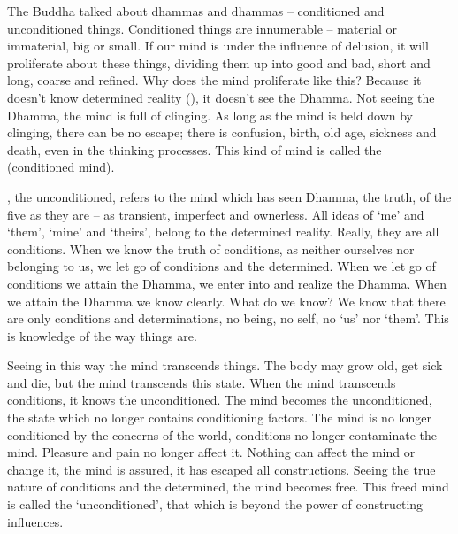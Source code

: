 The Buddha talked about  dhammas and  dhammas -- conditioned and unconditioned things. Conditioned things are innumerable -- material or immaterial, big or small. If our mind is under the influence of delusion, it will proliferate about these things, dividing them up into good and bad, short and long, coarse and refined. Why does the mind proliferate like this? Because it doesn't know determined reality (), it doesn't see the Dhamma. Not seeing the Dhamma, the mind is full of clinging. As long as the mind is held down by clinging, there can be no escape; there is confusion, birth, old age, sickness and death, even in the thinking processes. This kind of mind is called the  (conditioned mind).

, the unconditioned, refers to the mind which has seen Dhamma, the truth, of the five  as they are -- as transient, imperfect and ownerless. All ideas of `me' and `them', `mine' and `theirs', belong to the determined reality. Really, they are all conditions. When we know the truth of conditions, as neither ourselves nor belonging to us, we let go of conditions and the determined. When we let go of conditions we attain the Dhamma, we enter into and realize the Dhamma. When we attain the Dhamma we know clearly. What do we know? We know that there are only conditions and determinations, no being, no self, no `us' nor `them'. This is knowledge of the way things are.

Seeing in this way the mind transcends things. The body may grow old, get sick and die, but the mind transcends this state. When the mind transcends conditions, it knows the unconditioned. The mind becomes the unconditioned, the state which no longer contains conditioning factors. The mind is no longer conditioned by the concerns of the world, conditions no longer contaminate the mind. Pleasure and pain no longer affect it. Nothing can affect the mind or change it, the mind is assured, it has escaped all constructions. Seeing the true nature of conditions and the determined, the mind becomes free. This freed mind is called the `unconditioned', that which is beyond the power of constructing influences.

